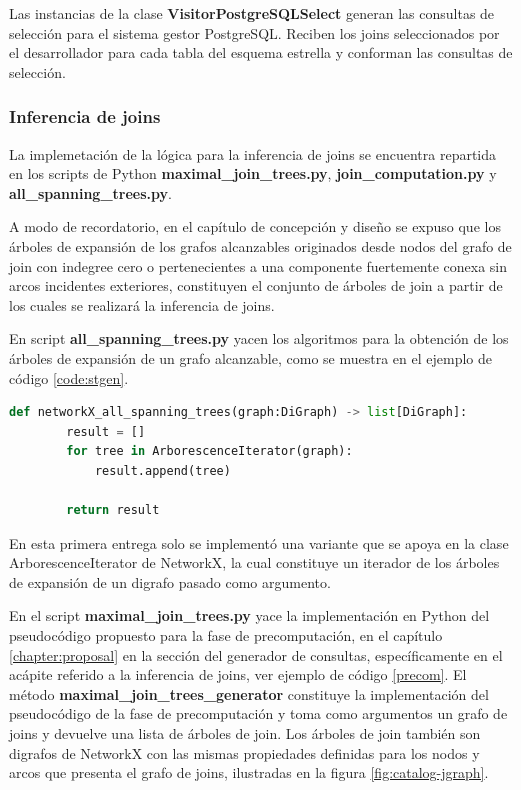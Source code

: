 Las instancias de la clase \textbf{VisitorPostgreSQLSelect} generan las consultas de selección para 
el sistema gestor PostgreSQL. Reciben los joins seleccionados por el desarrollador para cada tabla del esquema 
estrella y conforman las consultas de selección.

\subsubsection{Inferencia de joins}

La implemetaci\'on de la l\'ogica para la inferencia de joins se encuentra repartida 
en los scripts de Python \textbf{maximal\_join\_trees.py}, \textbf{join\_computation.py} y 
\textbf{all\_spanning\_trees.py}. 

A modo de recordatorio, en el cap\'itulo de concepción y diseño se expuso que los \'arboles de expansión 
de los grafos alcanzables originados desde nodos del grafo de join con indegree cero o pertenecientes 
a una componente fuertemente conexa sin arcos incidentes exteriores, constituyen el conjunto de \'arboles 
de join a partir de los cuales se realizar\'a la inferencia de joins.

En script \textbf{all\_spanning\_trees.py} yacen los algoritmos para la obtención de los \'arboles de expansión 
de un grafo alcanzable, como se muestra en el ejemplo de c\'odigo \ref{code:stgen}.

\begin{lstlisting}[label={code:stgen}, caption={Algoritmo para la generación de \'arboles de expansión}, language={python}]
    def networkX_all_spanning_trees(graph:DiGraph) -> list[DiGraph]:
        result = []
        for tree in ArborescenceIterator(graph):
            result.append(tree)

        return result
\end{lstlisting}

En esta primera entrega solo se implement\'o una variante que se apoya en la 
clase ArborescenceIterator de NetworkX, la cual constituye un iterador de los \'arboles de expansión de un digrafo 
pasado como argumento.


En el script \textbf{maximal\_join\_trees.py} yace
la implementación en Python del pseudoc\'odigo propuesto para la fase de precomputaci\'on, en el 
capítulo \ref{chapter:proposal} en la sección del generador de consultas, específicamente en el ac\'apite referido 
a la inferencia de joins, ver ejemplo de c\'odigo \ref{precom}. El m\'etodo \textbf{maximal\_join\_trees\_generator} 
constituye la implementación del pseudoc\'odigo de la fase de precomputaci\'on y toma como argumentos 
un grafo de joins y devuelve una lista de \'arboles de join. Los \'arboles de join también son digrafos de 
NetworkX con las mismas propiedades definidas para los nodos y arcos que presenta el grafo de joins, 
ilustradas en la figura \ref{fig:catalog-jgraph}.

